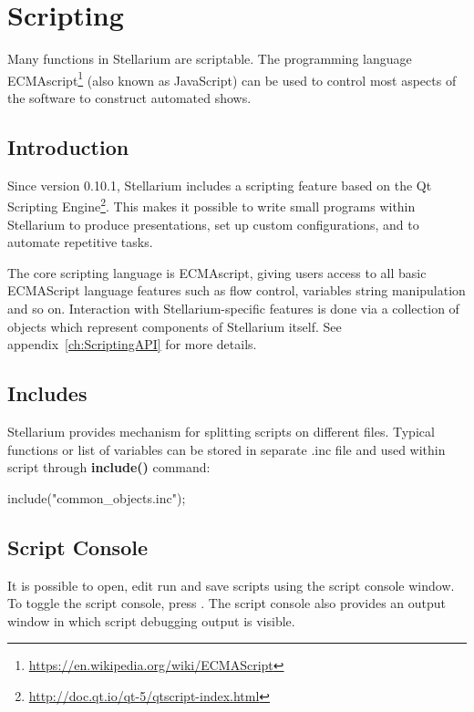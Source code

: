 
\chapter{Scripting}
\label{ch:scripting}

Many functions in Stellarium are scriptable. The programming language
ECMAscript\footnote{\url{https://en.wikipedia.org/wiki/ECMAScript}} (also known as JavaScript) can be used to control most
aspects of the software to construct automated shows.

\section{Introduction}
\label{sec:scripting:introduction}

Since version 0.10.1, Stellarium includes a scripting feature based on the Qt Scripting Engine\footnote{\url{http://doc.qt.io/qt-5/qtscript-index.html}}. This makes it possible to write small programs within Stellarium to produce presentations, set up custom configurations, and to automate repetitive tasks. 

The core scripting language is ECMAscript, giving users access to all basic ECMAScript language features such as flow control, variables string manipulation and so on. Interaction with Stellarium-specific features is done via a collection of objects which represent components of Stellarium itself. See appendix~\ref{ch:ScriptingAPI} for more details.

\section{Includes}
\label{sec:scripting:includes}

Stellarium provides mechanism for splitting scripts on different files. Typical functions or list of variables can be stored in separate .inc file and used within script through \textbf{include()} command:
\begin{script}
include("common_objects.inc");
\end{script}

\section{Script Console}
\label{sec:scripting:console}
It is possible to open, edit run and save scripts using the script console window. To toggle the script console, press . The script console also provides an output window in which script debugging output is visible.

